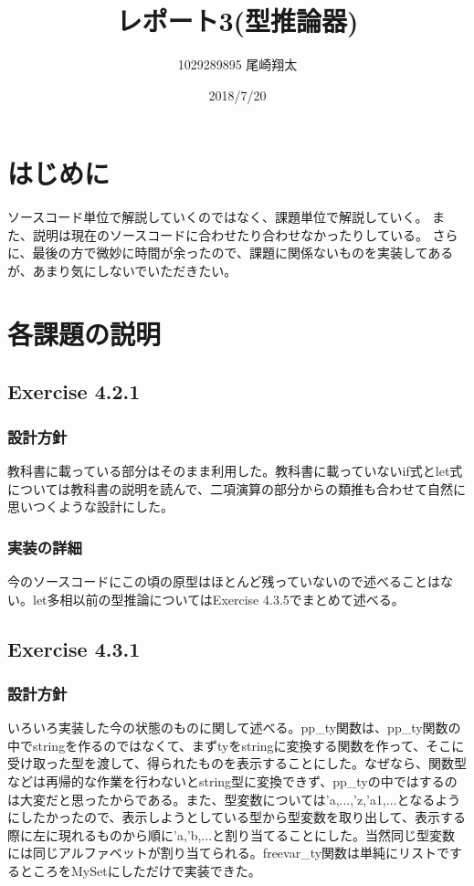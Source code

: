 \documentclass{jarticle}
\begin{document}
\title{レポート3(型推論器)}
\author{1029289895 尾崎翔太}
\date{2018/7/20}

\maketitle
\newpage

\section{はじめに}
ソースコード単位で解説していくのではなく、課題単位で解説していく。
また、説明は現在のソースコードに合わせたり合わせなかったりしている。
さらに、最後の方で微妙に時間が余ったので、課題に関係ないものを実装してあるが、あまり気にしないでいただきたい。

\section{各課題の説明}
\subsection{Exercise 4.2.1}
\subsubsection{設計方針}
教科書に載っている部分はそのまま利用した。教科書に載っていないif式とlet式については教科書の説明を読んで、二項演算の部分からの類推も合わせて自然に思いつくような設計にした。

\subsubsection{実装の詳細}
今のソースコードにこの頃の原型はほとんど残っていないので述べることはない。let多相以前の型推論についてはExercise 4.3.5でまとめて述べる。

\subsection{Exercise 4.3.1}
\subsubsection{設計方針}
いろいろ実装した今の状態のものに関して述べる。pp\_ty関数は、pp\_ty関数の中でstringを作るのではなくて、まずtyをstringに変換する関数を作って、そこに受け取った型を渡して、得られたものを表示することにした。なぜなら、関数型などは再帰的な作業を行わないとstring型に変換できず、pp\_tyの中ではするのは大変だと思ったからである。また、型変数については'a,...,'z,'a1,...となるようにしたかったので、表示しようとしている型から型変数を取り出して、表示する際に左に現れるものから順に'a,'b,...と割り当てることにした。当然同じ型変数には同じアルファベットが割り当てられる。freevar\_ty関数は単純にリストでするところをMySetにしただけで実装できた。
\end{document}
